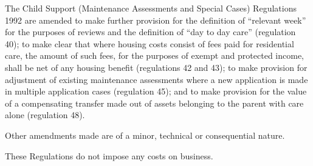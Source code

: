 \documentclass[12pt,a4paper]{article}
\begin{document}
  The Child Support (Maintenance Assessments and Special Cases) Regulations 1992 are amended to make further provision for the definition of “relevant week” for the purposes of reviews and the definition of “day to day care” (regulation 40); to make clear that where housing costs consist of fees paid for residential care, the amount of such fees, for the purposes of exempt and protected income, shall be net of any housing benefit (regulations 42 and 43); to make provision for adjustment of existing maintenance assessments where a new application is made in multiple application cases (regulation 45); and to make provision for the value of a compensating transfer made out of assets belonging to the parent with care alone (regulation 48).

  Other amendments made are of a minor, technical or consequential nature.

  These Regulations do not impose any costs on business.
\end{document}
